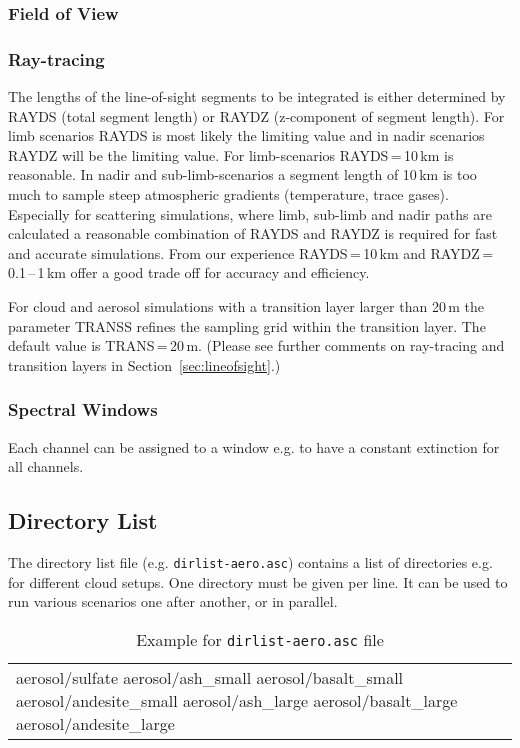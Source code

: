 \subsubsection{Field of View}
\todo

\subsubsection{Ray-tracing}
The lengths of the line-of-sight segments to be integrated is either determined by RAYDS (total segment length) or RAYDZ (z-component of segment length). For limb scenarios RAYDS is most likely the limiting value and in nadir scenarios RAYDZ will be the limiting value. For limb-scenarios RAYDS\,=\,10\,km is reasonable. In nadir and sub-limb-scenarios a segment length of 10\,km is too much to sample steep atmospheric gradients (temperature, trace gases). Especially for scattering simulations, where limb, sub-limb and nadir paths are calculated a reasonable combination of RAYDS and RAYDZ is required for fast and accurate simulations. From our experience RAYDS\,=\,10\,km and RAYDZ\,=\,0.1\,--\,1\,km offer a good trade off for accuracy and efficiency. 

For cloud and aerosol simulations with a transition layer larger than 20\,m the parameter TRANSS refines the sampling grid within the transition layer. The default value is TRANS\,=\,20\,m. (Please see further comments on ray-tracing and transition layers in Section~\ref{sec:lineofsight}.)

\subsubsection{Spectral Windows}
Each channel can be assigned to a window e.g. to have a constant extinction for all channels.

\subsection{Directory List}
\label{sec:DirlistFile}
The directory list file (e.g. \texttt{dirlist-aero.asc}) contains a list of directories e.g. for different cloud setups. One directory must be given per line. It can be used to run various scenarios one after another, or in parallel. 

\begin{table*}[!h]
\caption{Example for \texttt{dirlist-aero.asc} file}
\begin{tabular}{l}
aerosol/sulfate
aerosol/ash\_small
aerosol/basalt\_small
aerosol/andesite\_small
aerosol/ash\_large
aerosol/basalt\_large
aerosol/andesite\_large
\end{tabular}
\end{table*} 

